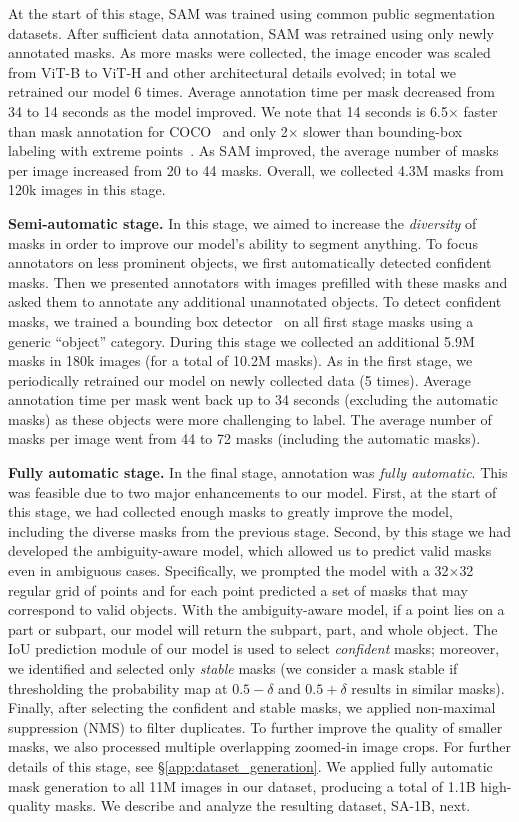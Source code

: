At the start of this stage, SAM was trained using common public segmentation datasets. After sufficient data annotation, SAM was retrained using only newly annotated masks. As more masks were collected, the image encoder was scaled from ViT-B to ViT-H and other architectural details evolved; in total we retrained our model 6 times. Average annotation time per mask decreased from 34 to 14 seconds as the model improved. We note that 14 seconds is 6.5${\times}$ faster than mask annotation for COCO~\cite{Lin2014} and only 2${\times}$ slower than bounding-box labeling with extreme points~\cite{papadopoulos2017extreme,maninis2018deep}. As SAM improved, the average number of masks per image increased from 20 to 44 masks. Overall, we collected 4.3M masks from 120k images in this stage.

\textbf{Semi-automatic stage.} In this stage, we aimed to increase the \emph{diversity} of masks in order to improve our model's ability to segment anything. To focus annotators on less prominent objects, we first automatically detected confident masks. Then we presented annotators with images prefilled with these masks and asked them to annotate any additional unannotated objects. To detect confident masks, we trained a bounding box detector~\cite{Ren2015} on all first stage masks using a generic ``object'' category. During this stage we collected an additional 5.9M masks in 180k images (for a total of 10.2M masks). As in the first stage, we periodically retrained our model on newly collected data (5 times). Average annotation time per mask went back up to 34 seconds (excluding the automatic masks) as these objects were more challenging to label. The average number of masks per image went from 44 to 72 masks (including the automatic masks).

\textbf{Fully automatic stage.} In the final stage, annotation was \emph{fully automatic}. This was feasible due to two major enhancements to our model. First, at the start of this stage, we had collected enough masks to greatly improve the model, including the diverse masks from the previous stage. Second, by this stage we had developed the ambiguity-aware model, which allowed us to predict valid masks even in ambiguous cases. Specifically, we prompted the model with a 32${\times}$32 regular grid of points and for each point predicted a set of masks that may correspond to valid objects. With the ambiguity-aware model, if a point lies on a part or subpart, our model will return the subpart, part, and whole object. The IoU prediction module of our model is used to select \emph{confident} masks; moreover, we identified and selected only \emph{stable} masks (we consider a mask stable if thresholding the probability map at $0.5-\delta$ and $0.5+\delta$ results in similar masks). Finally, after selecting the confident and stable masks, we applied non-maximal suppression (NMS) to filter duplicates. To further improve the quality of smaller masks, we also processed multiple overlapping zoomed-in image crops. For further details of this stage, see \S\ref{app:dataset_generation}. We applied fully automatic mask generation to all 11M images in our dataset, producing a total of 1.1B high-quality masks. We describe and analyze the resulting dataset, \mbox{SA-1B}, next.

